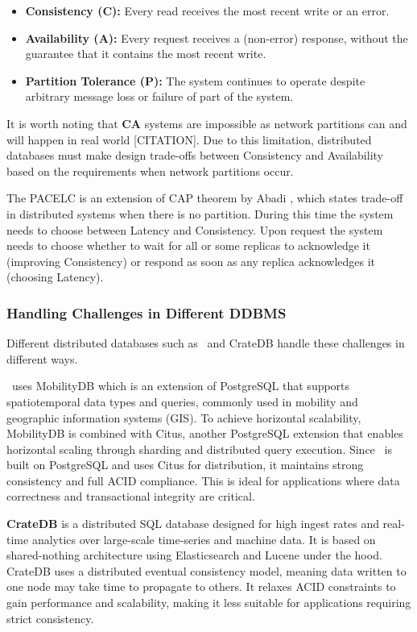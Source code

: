 \begin{itemize}
	\item \textbf{Consistency (C):} Every read receives the most recent write or an error.
	\item \textbf{Availability (A):} Every request receives a (non-error) response, without the guarantee that it contains the most recent write.
	\item \textbf{Partition Tolerance (P):} The system continues to operate despite arbitrary message loss or failure of part of the system.
\end{itemize}

It is worth noting that \textbf{CA} systems are impossible as network partitions can and will happen in real world [CITATION].
Due to this limitation, distributed databases must make design trade-offs between Consistency and Availability based on the requirements when network partitions occur.

The PACELC is an extension of CAP theorem by Abadi \parencite{abadiConsistencyTradeoffsModern2012}, which states trade-off in distributed systems when there is no partition.
During this time the system needs to choose between Latency and Consistency.
Upon request the system needs to choose whether to wait for all or some replicas to acknowledge it (improving Consistency) or respond as soon as any replica acknowledges it (choosing Latency).

\subsubsection{Handling Challenges in Different DDBMS}
Different distributed databases such as \mobilitydbc~and CrateDB handle these challenges in different ways.

\textbf{\mobilitydbc}~uses MobilityDB which is an extension of PostgreSQL that supports spatiotemporal data types and queries, commonly used in mobility and geographic information systems (GIS).
To achieve horizontal scalability, MobilityDB is combined with Citus, another PostgreSQL extension that enables horizontal scaling through sharding and distributed query execution.
Since \mobilitydbc~is built on PostgreSQL and uses Citus for distribution, it maintains strong consistency and full ACID compliance.
This is ideal for applications where data correctness and transactional integrity are critical.

\textbf{CrateDB} is a distributed SQL database designed for high ingest rates and real-time analytics over large-scale time-series and machine data.
It is based on shared-nothing architecture using Elasticsearch and Lucene under the hood.
CrateDB uses a distributed eventual consistency model, meaning data written to one node may take time to propagate to others.
It relaxes ACID constraints to gain performance and scalability, making it less suitable for applications requiring strict consistency.

